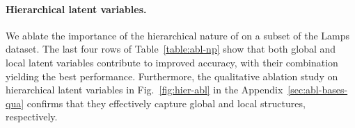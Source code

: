 \paragraph{Hierarchical latent variables.}
We ablate the importance of the hierarchical nature of \name{} on a subset of the Lamps dataset.
The last four rows of Table~\ref{table:abl-np} show that both global and local latent variables contribute to improved accuracy, with their combination yielding the best performance. Furthermore, the qualitative ablation study on hierarchical latent variables in Fig.~\ref{fig:hier-abl} in the Appendix~\ref{sec:abl-bases-qua} confirms that they effectively capture global and local structures, respectively.




